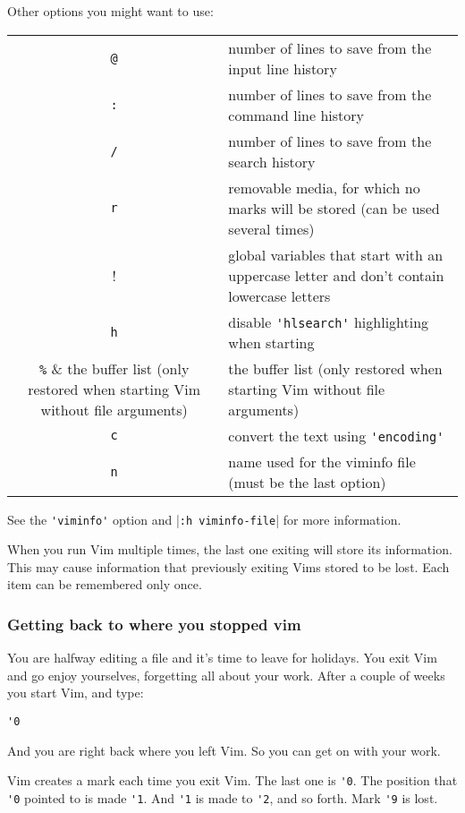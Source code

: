 Other options you might want to use:
\begin{center} \begin{longtable}{c l}
				\verb!@! & number of lines to save from the input line history \\
				\verb!:! & number of lines to save from the command line history \\
				\verb!/! & number of lines to save from the search history \\
				\verb!r! & removable media, for which no marks will be stored (can be used several times) \\
				\verb!!! & global variables that start with an uppercase letter and don't contain lowercase letters \\
				\verb!h! & disable \verb!'hlsearch'! highlighting when starting \\
				\verb!%! & the buffer list (only restored when starting Vim without file arguments) \\
				\verb!c! & convert the text using \verb!'encoding'! \\
				\verb!n! & name used for the viminfo file (must be the last option) \\
\end{longtable} \end{center}

See the \verb!'viminfo'! option and |\verb!:h viminfo-file!| for more information.

When you run Vim multiple times, the last one exiting will store its information.
This may cause information that previously exiting Vims stored to be lost.
Each item can be remembered only once.

\subsubsection{Getting back to where you stopped vim}
You are halfway editing a file and it's time to leave for holidays.
You exit Vim and go enjoy yourselves, forgetting all about your work.
After a couple of weeks you start Vim, and type:

\begin{Verbatim}[samepage=true]
 '0
\end{Verbatim}

And you are right back where you left Vim.
So you can get on with your work.

Vim creates a mark each time you exit Vim.
The last one is \verb!'0!.
The position that \verb!'0! pointed to is made \verb!'1!.
And \verb!'1! is made to \verb!'2!, and so forth.
Mark \verb!'9! is lost.

